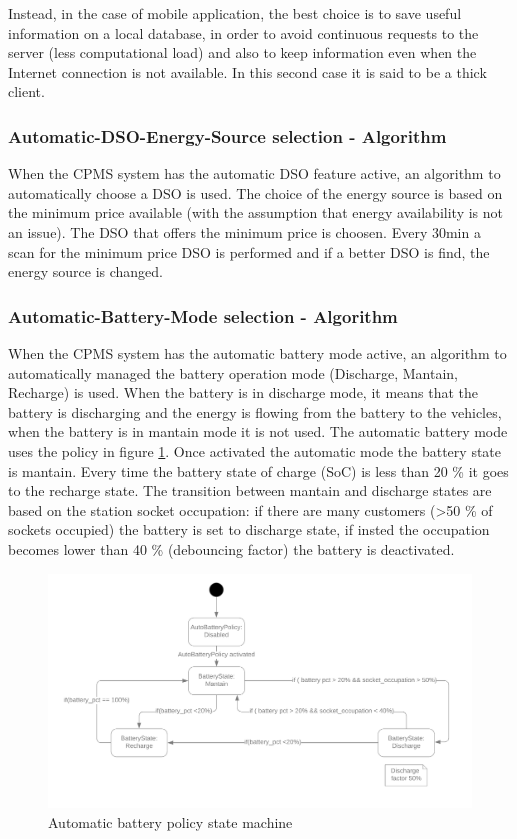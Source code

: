 Instead, in the case of mobile application, the best choice is to save useful information on a local database, in order to avoid continuous requests to the server (less computational load) and also to keep information even when the Internet connection is not available. 
In this second case it is said to be a thick client.

\subsubsection{Automatic-DSO-Energy-Source selection - Algorithm}
When the CPMS system has the automatic DSO feature active, an algorithm to automatically choose a DSO is used. The choice of the energy source is based on the minimum price available (with the assumption that energy availability is not an issue). The DSO that offers the minimum price is choosen. Every 30min a scan for the minimum price DSO is performed and if a better DSO is find, the energy source is changed.


\subsubsection{Automatic-Battery-Mode selection - Algorithm}
When the CPMS system has the automatic battery mode active, an algorithm to automatically managed the battery operation mode  (Discharge, Mantain, Recharge) is used. When the battery is in discharge mode, it means that the battery is discharging and the energy is flowing from the battery to the vehicles, when the battery is in mantain mode it is not used. The automatic battery mode uses the policy in figure \ref{battery_policy}. Once activated the automatic mode the battery state is mantain. Every time the battery state of charge (SoC) is less than 20 \% it goes to the recharge state.
The transition between mantain and discharge states are based on the station socket occupation: if there are many customers (>50 \% of sockets occupied) the battery is set to discharge state, if insted the occupation becomes lower than 40 \% (debouncing factor) the battery is deactivated.

\begin{center}
    \begin{figure}[H]
        \includegraphics[width=\textwidth]{./img/battery_policy.png}
        \caption{Automatic battery policy state machine}
        \label{battery_policy}
    \end{figure}
\end{center}

